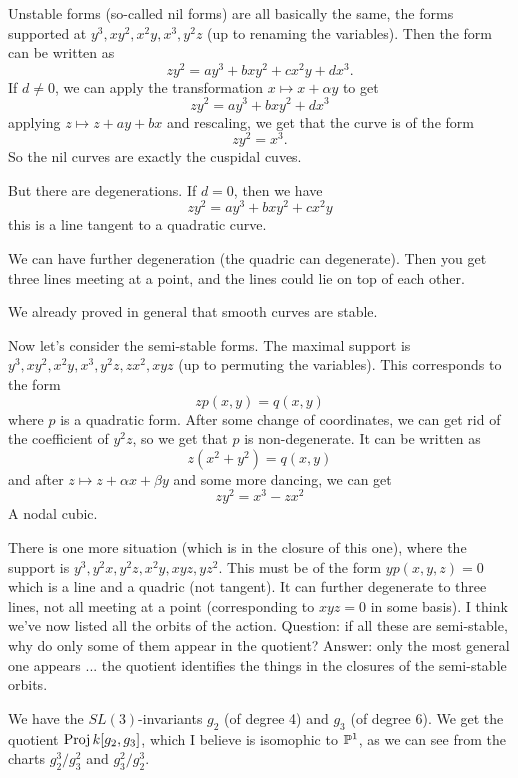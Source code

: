 Unstable forms (so-called nil forms) are all basically the same, the forms supported at $y^3,xy^2,x^2y,x^3,y^2z$ (up to renaming the variables). Then the form can be written as
\[
 zy^2=ay^3+bxy^2+cx^2y+dx^3.
\]
If $d\neq 0$, we can apply the transformation $x\mapsto x+\alpha y$ to get
\[
 zy^2=ay^3+bxy^2+dx^3
\]
applying $z\mapsto z+ay+bx$ and rescaling, we get that the curve is of the form
\[
 zy^2=x^3.
\]
So the nil curves are exactly the cuspidal cuves.

But there are degenerations. If $d=0$, then we have
\[
 zy^2=ay^3+bxy^2+cx^2y
\]
this is a line tangent to a quadratic curve.

We can have further degeneration (the quadric can degenerate). Then you get three lines meeting at a point, and the lines could lie on top of each other.

We already proved in general that smooth curves are stable.

Now let's consider the semi-stable forms. The maximal support is $y^3,xy^2,x^2y,x^3,y^2z,zx^2,xyz$ (up to permuting the variables). This corresponds to the form
\[
 zp(x,y)=q(x,y)
\]
where $p$ is a quadratic form. After some change of coordinates, we can get rid of the coefficient of $y^2z$, so we get that $p$ is non-degenerate. It can be written as
\[
 z(x^2+y^2)=q(x,y)
\]
and after $z\mapsto z+\alpha x+\beta y$ and some more dancing, we can get
\[
 zy^2=x^3-zx^2
\]
A nodal cubic.

There is one more situation (which is in the closure of this one), where the support is $y^3, y^2x, y^2z, x^2y,xyz,yz^2$. This must be of the form $yp(x,y,z)=0$ which is a line and a quadric (not tangent). It can further degenerate to three lines, not all meeting at a point (corresponding to $xyz=0$ in some basis). I think we've now listed all the orbits of the action. Question: if all these are semi-stable, why do only some of them appear in the quotient? Answer: only the most general one appears ... the quotient identifies the things in the closures of the semi-stable orbits.

We have the $SL(3)$-invariants $g_2$ (of degree 4) and $g_3$ (of degree 6). We get the quotient $\operatorname{Proj} k[g_2,g_3]$, which I believe is isomophic to $\mathbb{P}^1$, as we can see from the charts $g_2^3/g_3^2$ and $g_3^2/g_2^3$.